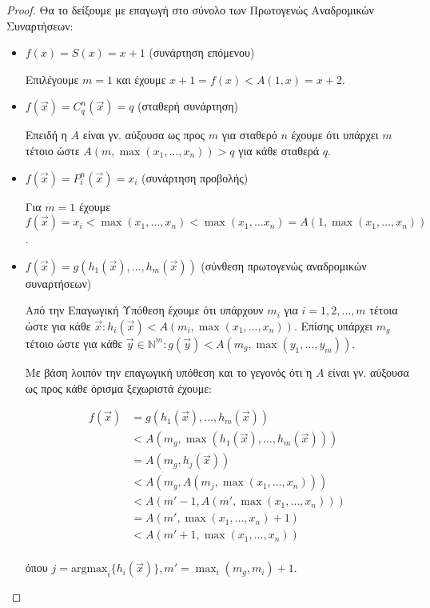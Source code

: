 \documentclass[a4paper, oneside, 11pt]{article}
\theoremstyle{definition}
\newcommand{\ora}{\vec}
\begin{document}
\begin{proof}
Θα το δείξουμε με επαγωγή στο σύνολο των Πρωτογενώς Αναδρομικών Συναρτήσεων:

\begin{itemize}
\item $f(x) = S(x) = x+1$ (συνάρτηση επόμενου)

Επιλέγουμε $m = 1$ και έχουμε $x+1 = f(x) < A(1, x) = x+2$.

\item $f(\ora{x}) = C_q^n(\ora{x}) = q$ (σταθερή συνάρτηση)

Επειδή η $A$ είναι γν. αύξουσα ως προς $m$ για σταθερό $n$ έχουμε ότι υπάρχει
$m$ τέτοιο ώστε $A(m, \max(x_1, \ldots, x_n)) > q$ για κάθε σταθερά $q$.

\item $f(\ora{x}) = P_i^n(\ora{x}) = x_i$ (συνάρτηση προβολής)

Για $m=1$ έχουμε $f(\ora{x}) = x_i < \max(x_1, \ldots, x_n) < \max(x_1, \ldots
x_n) = A(1, \max(x_1, \ldots, x_n))$.

\item $f(\ora{x}) = g(h_1(\ora{x}), \ldots, h_m(\ora{x}))$ (σύνθεση πρωτογενώς
αναδρομικών συναρτήσεων)

Από την Επαγωγική Υπόθεση έχουμε ότι υπάρχουν $m_i$ για $i = 1, 2, \ldots, m$
τέτοια ώστε για κάθε $\ora{x}: h_i(\ora{x}) < A(m_i, \max(x_1, \ldots, x_n))$.
Επίσης υπάρχει $m_g$ τέτοιο ώστε για κάθε $\ora{y} \in \mathbb{N}^m: g(\ora{y})
< A(m_g, \max(y_1, \ldots, y_m))$.

Με βάση λοιπόν την επαγωγική υπόθεση και το γεγονός ότι η $A$ είναι γν. αύξουσα
ως προς κάθε όρισμα ξεχωριστά έχουμε:

\begin{align*}
   f(\ora{x}) &= g(h_1(\ora{x}), \ldots, h_m(\ora{x}))\\
              &< A(m_g, \max(h_1(\ora{x}), \ldots, h_m(\ora{x})))\\
              &= A(m_g, h_j(\ora{x}))\\
              &< A(m_g, A(m_j, \max(x_1, \ldots, x_n)))\\
              &< A(m'-1, A(m', \max(x_1, \ldots, x_n)))\\
              &= A(m', \max(x_1, \ldots, x_n)+1)\\
              &< A(m'+1, \max(x_1, \ldots, x_n))\\
\end{align*}

όπου $j = \text{argmax}_i \{ h_i(\ora{x}) \}, m' = \max_i(m_g, m_i) + 1$.


\end{itemize}
\end{proof}
\end{document}
